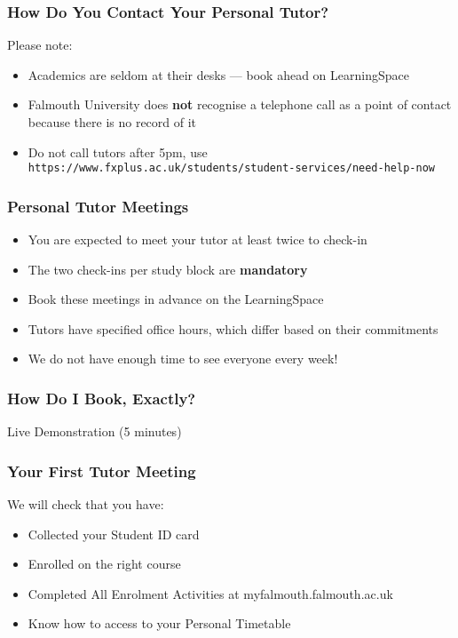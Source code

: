 \begin{frame}
	\frametitle{How Do You Contact Your Personal Tutor?}
	
	Please note:
				
	\begin{itemize}
		\item Academics are seldom at their desks --- book ahead on LearningSpace
		\item Falmouth University does \textbf{not} recognise a telephone call as a point of contact because there is no record of it
		\item Do not call tutors after 5pm, use \texttt{https://www.fxplus.ac.uk/students/student-services/need-help-now}		
	\end{itemize}
\end{frame}

\begin{frame}
	\frametitle{Personal Tutor Meetings}	
	\begin{itemize}
		\item You are expected to meet your tutor at least twice to check-in
		\item The two check-ins per study block are \textbf{mandatory}
		\item Book these meetings in advance on the LearningSpace
		
		\item Tutors have specified office hours, which differ based on their commitments
		\item We do not have enough time to see everyone every week! 
	\end{itemize}
\end{frame}

\begin{frame}
	\frametitle{How Do I Book, Exactly?}	
	\begin{center}
		Live Demonstration (5 minutes)
	\end{center}
\end{frame}

\begin{frame}
	\frametitle{Your First Tutor Meeting}	
	
	We will check that you have:
	
	\begin{itemize}
	\item Collected your Student ID card
	\item Enrolled on the right course
	\item Completed All Enrolment Activities at myfalmouth.falmouth.ac.uk
	\item Know how to access to your Personal Timetable
	\end{itemize}
\end{frame}

